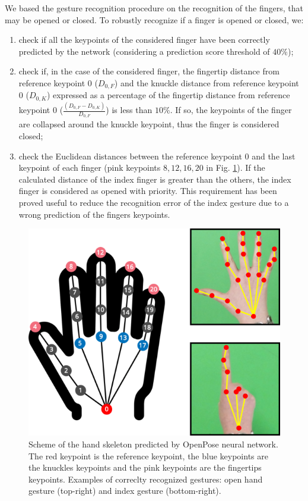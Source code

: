 \documentclass[a4paper, 10pt, conference]{ieeeconf}      %
\begin{document}
We based the gesture recognition procedure on the recognition of the fingers, that may be opened or closed. To robustly recognize if a finger is opened or closed, we:
\begin{enumerate}
\item check if all the keypoints of the considered finger have been correctly predicted by the network (considering a prediction score threshold of $40\%$);
\item check if, in the case of the considered finger, the fingertip distance from reference keypoint $0$ ($D_{0,F}$) and the knuckle distance from reference keypoint $0$ ($D_{0,K}$) expressed as a percentage of the fingertip distance from reference keypoint $0$ ($\frac{(D_{0,F} - D_{0,K})}{D_{0,F}}$) is less than $10\%$. If so, the keypoints of the finger are collapsed around the knuckle keypoint, thus the finger is considered closed;
\item check the Euclidean distances between the reference keypoint $0$ and the last keypoint of each finger (pink keypoints $8, 12, 16, 20$ in Fig. \ref{fig:keypoints}). If the calculated distance of the index finger is greater than the others, the index finger is considered as opened with priority. This requirement has been proved useful to reduce the recognition error of the index gesture due to a wrong prediction of the fingers keypoints.
\end{enumerate}

\begin{figure} [t]
  \centering
  \includegraphics[width=1\columnwidth]{figures/keypoints.eps}
  \caption{Scheme of the hand skeleton predicted by OpenPose neural network. The red keypoint is the reference keypoint, the blue keypoints are the knuckles keypoints and the pink keypoints are the fingertips keypoints. Examples of correclty recognized gestures: open hand gesture (top-right) and index gesture (bottom-right).}
  \label{fig:keypoints}
\end{figure}
\end{document}

